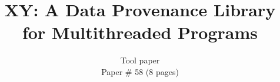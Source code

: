 \documentclass{IEEEtran}
\newcommand{\projecttitle}{\textsc{XY}\xspace}
\begin{document}
\author{
Tool paper\\Paper \# 58 (8 pages)
}

\title{\huge \projecttitle: A Data Provenance Library for Multithreaded Programs}
\maketitle
















\footnotesize


 
\end{document}
